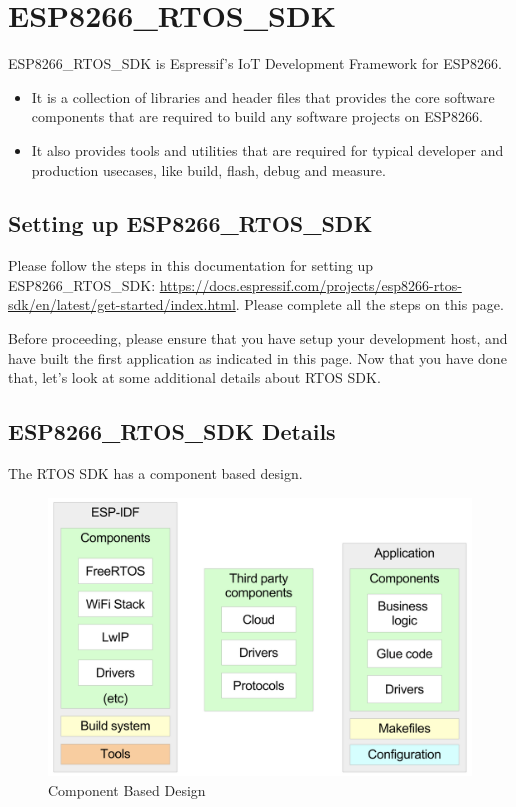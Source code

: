 \documentclass[main.tex]{subfiles}
\begin{document}
\section{ESP8266\_RTOS\_SDK}

ESP8266\_RTOS\_SDK is Espressif's IoT Development Framework for ESP8266. 
\begin{itemize}
    \item It is a collection of libraries and header files that provides the core software components that are required to build any software projects on ESP8266. 
    \item It also provides tools and utilities that are required for typical developer and production usecases, like build, flash, debug and measure.
\end{itemize}

\subsection{Setting up ESP8266\_RTOS\_SDK}

Please follow the steps in this documentation for setting up ESP8266\_RTOS\_SDK: \url{https://docs.espressif.com/projects/esp8266-rtos-sdk/en/latest/get-started/index.html}. Please complete all the steps on this page.

Before proceeding, please ensure that you have setup your development host, and have built the first application as indicated in this page. Now that you have done that, let's look at some additional details about RTOS SDK.

\subsection{ESP8266\_RTOS\_SDK Details}

The RTOS SDK has a component based design.

\begin{figure}[h!]
    \centering
    \includegraphics[width=\textwidth]{../../_static/idf_comp.png}
    \caption{Component Based Design}
    \label{fig:idf_comp_design}
\end{figure}
\end{document}
